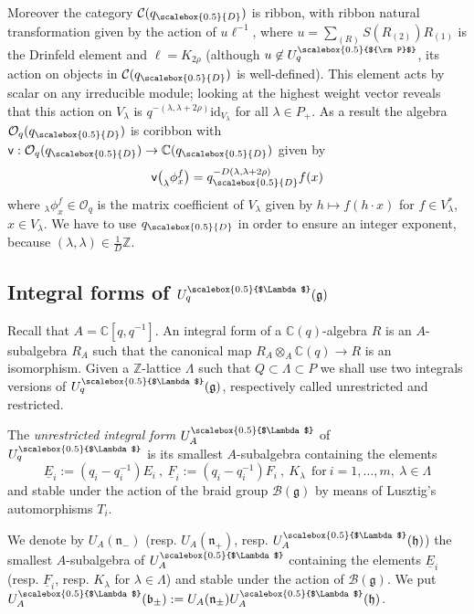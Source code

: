 \documentclass[11pt]{amsart}
\newcommand{\mc}{\mathbb{C}}
\newcommand{\qD}{q_{\scalebox{0.5}{D}}}
\newcommand{\Pup}{{\scalebox{0.5}{${\rm P}$}}}
\newcommand{\Lam}{{\scalebox{0.5}{$\Lambda$}}}
\begin{document}
\indent Moreover the category $\mathcal{C}(\qD)$ is ribbon, with ribbon natural transformation given by the action of $u \ell^{-1}$, where $u = \textstyle \sum_{(R)} S(R_{(2)})R_{(1)}$ is the Drinfeld element and $\ell = K_{2\rho}$ (although $u \not\in U_q^\Pup$, its action on objects in $\mathcal{C}(\qD)$ is well-defined). This element acts by scalar on any irreducible module; looking at the highest weight vector reveals that this action on $V_\lambda$ is $q^{-(\lambda,\lambda+2\rho)}\mathrm{id}_{V_\lambda}$ for all $\lambda \in P_+$. As a result the algebra $\mathcal{O}_q(\qD)$ is coribbon with $\mathsf{v} : \mathcal{O}_q(\qD) \to \mathbb{C}(\qD)$ given by
\begin{equation}\label{coribbonOq}
\mathsf{v}\bigl( _\lambda\phi^f_x \bigr) = \qD^{-D(\lambda,\lambda+2\rho)}f(x)
\end{equation}
where $_\lambda\phi^f_x \in \mathcal{O}_q$ is the matrix coefficient of $V_\lambda$ given by $h \mapsto f(h\cdot x)$ for $f \in V_\lambda^*$, $x \in V_\lambda$. We have to use $\qD$ in order to ensure an integer exponent, because $\textstyle (\lambda,\lambda) \in \frac{1}{D}\mathbb{Z}$.

\subsection{Integral forms of \texorpdfstring{$U_q^\Lam(\mathfrak{g})$}{the quantum enveloping algebra}}\label{integralFormsUq}
Recall that $A=\mc[q,q^{-1}]$. An integral form of a $\mc(q)$-algebra $R$ is an $A$-subalgebra $R_A$ such that the canonical map $R_A \otimes_{A} \mc(q) \to R$ is an isomorphism. Given a $\mathbb{Z}$-lattice $\Lambda$ such that $Q \subset \Lambda \subset P$ we shall use two integrals versions of $U_q^\Lam(\mathfrak{g})$, respectively called unrestricted and restricted.

\smallskip

\indent The {\em unrestricted integral form} $U_A^\Lam$ of $U_q^\Lam$ is its smallest $A$-subalgebra containing the elements
$$\underline{E}_i:=(q_i-q_i^{-1})E_i\ ,\ \underline{F}_i:=(q_i-q_i^{-1})F_i\ , \ K_\lambda\ \  \mathrm{for}\ i=1,\ldots,m, \:\lambda \in \Lambda$$ and stable under the action of the braid group ${\mathcal B}(\mathfrak{g})$ by means of Lusztig's automorphisms $T_i$. 

We denote by $U_A(\mathfrak{n}_-)$ (resp.  $U_A(\mathfrak{n}_+)$, resp. $U_A^\Lam(\mathfrak{h})$)  the smallest $A$-subalgebra of $U_A^\Lam$ containing the elements $\underline{E}_i$ (resp. $\underline{F}_i$, resp. $K_\lambda$ for $\lambda \in \Lambda$) and stable under the action of ${\mathcal B}(\mathfrak{g})$. We put $U_A^\Lam(\mathfrak{b}_\pm) := U_A(\mathfrak{n}_\pm)U_A^\Lam(\mathfrak{h})$. 
\end{document}
